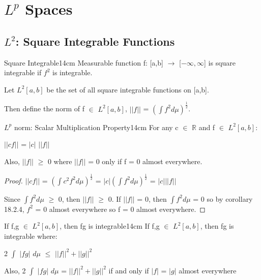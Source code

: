 \newpage

\section[Day 19: $L^p$ Spaces]{ $L^p$ Spaces }

\subsection{ $L^2$: Square Integrable Functions }

    \begin{definition}{Square Integrable}{14cm}
        Measurable function f: [a,b] $\rightarrow$ [$-\infty,\infty$]
        is {\color{lblue} square integrable} if $f^2$ is integrable.

        Let $L^2[a,b]$ be the set of all square integrable functions on [a,b].
        
        Then define the norm of f $\in$ $L^2[a,b]$,
        $||f||$ = $(\int f^2 d\mu)^{\frac{1}{2}}$.
    \end{definition}

    \vspace{0.5cm}



    \begin{wtheorem}{$L^p$ norm: Scalar Multiplication Property}{14cm}
        For any c $\in$ $\mathbb{R}$ and f $\in$ $L^2[a,b]$:

        \hspace{0.5cm}
        $||cf||$ = $|c|$ $||f||$

        Also, $||f||$ $\geq$ 0 where $||f||$ = 0 only if f = 0 almost everywhere.
    \end{wtheorem}

    \begin{proof}
        $||cf||$
        = $(\int c^2f^2 d\mu)^{\frac{1}{2}}$
        = $|c| (\int f^2 d\mu)^{\frac{1}{2}}$
        = $|c| ||f||$

        Since $\int f^2 d\mu$ $\geq$ 0, then $||f||$ $\geq$ 0.
        If $||f||$ = 0, then $\int f^2 d\mu$ = 0
        so by {\color{orange} corollary 18.2.4}, $f^2$ = 0 almost
        everywhere so f = 0 almost everywhere.
    \end{proof}

    \vspace{0.5cm}



    \begin{wtheorem}{If f,g $\in$ $L^2[a,b]$, then fg is integrable}{14cm}
        If f,g $\in$ $L^2[a,b]$, then fg is integrable where:

        \hspace{0.5cm}
        2 $\int$ $|fg|$ $d\mu$ $\leq$ $||f||^2 + ||g||^2$

        Also, 2 $\int$ $|fg|$ $d\mu$ = $||f||^2 + ||g||^2$
        if and only if $|f|$ = $|g|$ almost everywhere
    \end{wtheorem}


